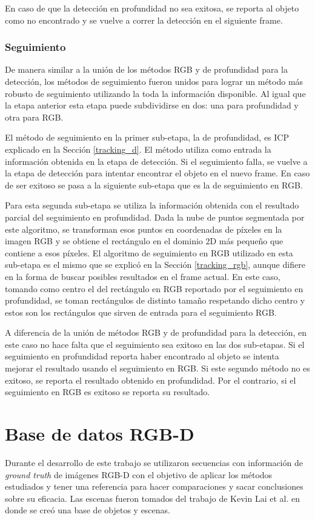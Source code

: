 En caso de que la detección en profundidad no sea exitosa, se reporta al objeto como no encontrado y se vuelve a correr la detección en el siguiente frame.


\subsection{Seguimiento}\label{tracking_rgbd}
De manera similar a la unión de los métodos RGB y de profundidad para la detección, los métodos de seguimiento fueron unidos para lograr un método más robusto de seguimiento utilizando la toda la información disponible. Al igual que la etapa anterior esta etapa puede subdividirse en dos: una para profundidad y otra para RGB.

El método de seguimiento en la primer sub-etapa, la de profundidad, es ICP explicado en la Sección \ref{tracking_d}. El método utiliza como entrada la información obtenida en la etapa de detección. Si el seguimiento falla, se vuelve a la etapa de detección para intentar encontrar el objeto en el nuevo frame. En caso de ser exitoso se pasa a la siguiente sub-etapa que es la de seguimiento en RGB.

Para esta segunda sub-etapa se utiliza la información obtenida con el resultado parcial del seguimiento en profundidad. Dada la nube de puntos segmentada por este algoritmo, se transforman esos puntos en coordenadas de píxeles en la imagen RGB y se obtiene el rectángulo en el dominio 2D más pequeño que contiene a esos píxeles. El algoritmo de seguimiento en RGB utilizado en esta sub-etapa es el mismo que se explicó en la Sección \ref{tracking_rgb}, aunque difiere en la forma de buscar posibles resultados en el frame actual. En este caso, tomando como centro el del rectángulo en RGB reportado por el seguimiento en profundidad, se toman rectángulos de distinto tamaño respetando dicho centro y estos son los rectángulos que sirven de entrada para el seguimiento RGB.

A diferencia de la unión de métodos RGB y de profundidad para la detección, en este caso no hace falta que el seguimiento sea exitoso en las dos sub-etapas. Si el seguimiento en profundidad reporta haber encontrado al objeto se intenta mejorar el resultado usando el seguimiento en RGB. Si este segundo método no es exitoso, se reporta el resultado obtenido en profundidad. Por el contrario, si el seguimiento en RGB es exitoso se reporta su resultado.


\chapter{Base de datos RGB-D}\label{base_rgbd}
Durante el desarrollo de este trabajo se utilizaron secuencias con información de \textit{ground truth} de imágenes RGB-D con el objetivo de aplicar los métodos estudiados y tener una referencia para hacer comparaciones y sacar conclusiones sobre su eficacia. Las escenas fueron tomados del trabajo de Kevin Lai et al. \cite{lai2011large} en donde se creó una base de objetos y escenas.


